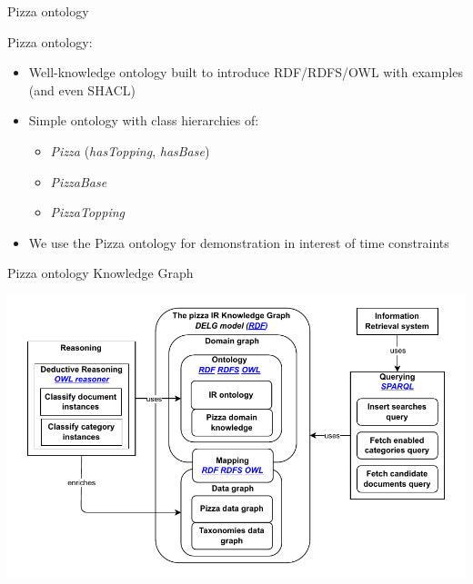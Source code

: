 \begin{frame}{Pizza ontology}

    Pizza ontology:
    \begin{itemize}
        \item Well-knowledge ontology built to introduce RDF/RDFS/OWL with examples (and even SHACL)
        \item Simple ontology with class hierarchies of:
        \begin{itemize}
            \item \emph{Pizza} (\emph{hasTopping}, \emph{hasBase})
            \item \emph{PizzaBase}
            \item \emph{PizzaTopping}
        \end{itemize} 
    \end{itemize}

    \begin{itemize}
        \item We use the Pizza ontology for demonstration in interest of time constraints 
    \end{itemize}

\end{frame}

\begin{frame}{Pizza ontology Knowledge Graph}

        \begin{center}
            \includegraphics[scale=0.65]{images/pizza-demo-kg.pdf} 
        \end{center}

\end{frame}